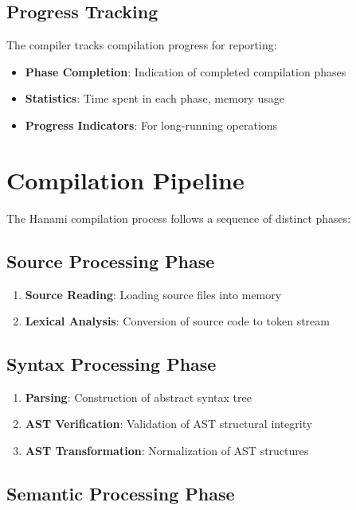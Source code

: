 \documentclass[12pt,a4paper]{article}
\begin{document}
\subsection{Progress Tracking}

The compiler tracks compilation progress for reporting:

\begin{itemize}
    \item \textbf{Phase Completion}: Indication of completed compilation phases
    \item \textbf{Statistics}: Time spent in each phase, memory usage
    \item \textbf{Progress Indicators}: For long-running operations
\end{itemize}

\section{Compilation Pipeline}

The Hanami compilation process follows a sequence of distinct phases:

\subsection{Source Processing Phase}

\begin{enumerate}
    \item \textbf{Source Reading}: Loading source files into memory
    \item \textbf{Lexical Analysis}: Conversion of source code to token stream
\end{enumerate}

\subsection{Syntax Processing Phase}

\begin{enumerate}
    \item \textbf{Parsing}: Construction of abstract syntax tree
    \item \textbf{AST Verification}: Validation of AST structural integrity
    \item \textbf{AST Transformation}: Normalization of AST structures
\end{enumerate}

\subsection{Semantic Processing Phase}
\end{document}
